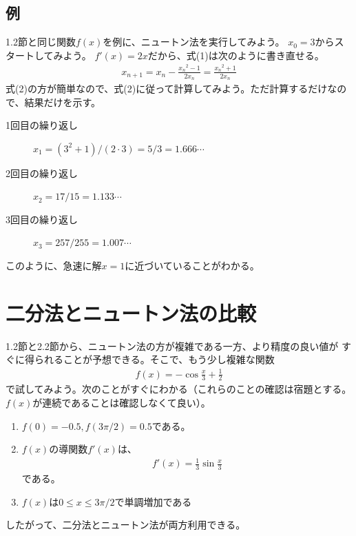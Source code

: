 \documentclass[a4paper, platex, dvipdfmx]{jsarticle}
\begin{document}
\subsection{例}
1.2節と同じ関数$f(x)$を例に、ニュートン法を実行してみよう。
$x_0=3$からスタートしてみよう。
$f'(x)=2x$だから、式(1)は次のように書き直せる。
\begin{align}
  x_{n+1}=x_n-\frac{{x_n}^2-1}{2x_n}=\frac{{x_n}^2+1}{2x_n}
\end{align}
式(2)の方が簡単なので、式(2)に従って計算してみよう。ただ計算するだけなので、結果だけを示す。
\begin{description}
  \item[1回目の繰り返し] $x_1=(3^2+1)/(2\cdot 3)=5/3=1.666\cdots$
  \item[2回目の繰り返し] $x_2=17/15=1.133\cdots$
  \item[3回目の繰り返し] $x_3=257/255=1.007\cdots$
\end{description}
このように、急速に解$x=1$に近づいていることがわかる。

\section{二分法とニュートン法の比較}
1.2節と2.2節から、ニュートン法の方が複雑である一方、より精度の良い値が
すぐに得られることが予想できる。そこで、もう少し複雑な関数
\begin{align}
  f(x)=-\cos\frac{x}{3}+\frac{1}{2}
\end{align}
で試してみよう。次のことがすぐにわかる（これらのことの確認は宿題とする。
$f(x)$が連続であることは確認しなくて良い）。
\begin{enumerate}
  \item $f(0)=-0.5,f(3\pi/2)=0.5$である。
  \item $f(x)$の導関数$f'(x)$は、
  \begin{align}
    f'(x)=\frac{1}{3}\sin\frac{x}{3}
  \end{align}
  である。
  \item $f(x)$は$0\leq x\leq 3\pi/2$で単調増加である
\end{enumerate}
したがって、二分法とニュートン法が両方利用できる。
\end{document}
